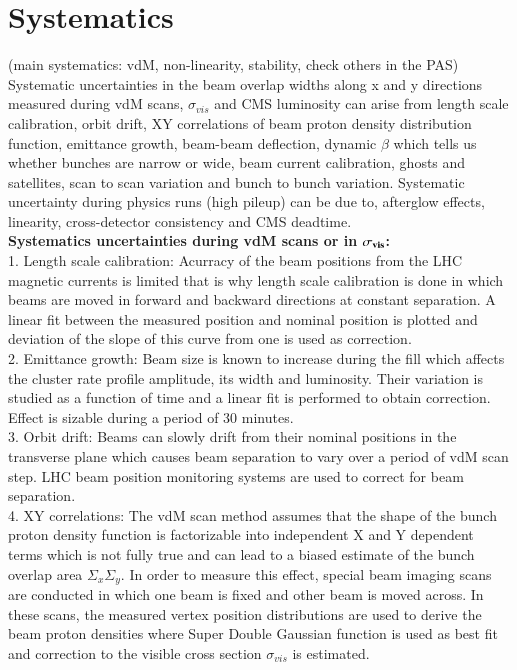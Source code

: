 \section{Systematics}
\label{sec:syst}
(main systematics: vdM, non-linearity, stability, check others in the PAS) \\

Systematic uncertainties in the beam overlap widths along x and y directions measured during vdM scans, $\sigma_{vis}$ and CMS luminosity can arise from length scale calibration, orbit drift, XY correlations of beam proton density distribution function, emittance growth, beam-beam deflection, dynamic $\beta$ which tells us whether bunches are narrow or wide, beam current calibration, ghosts and satellites, scan to scan variation and bunch to bunch variation. Systematic uncertainty during physics runs (high pileup) can be due to, afterglow effects, linearity, cross-detector consistency and CMS deadtime. \\

\textbf{Systematics uncertainties during vdM scans or in $\bf{\sigma_{vis}}$:} \\

1. Length scale calibration: Acurracy of the beam positions from the LHC magnetic currents is limited that is why length scale calibration is done in which beams are moved in forward and backward directions at constant separation. A linear fit between the measured position and nominal position is plotted and deviation of the slope of this curve from one is used as correction. \\

2. Emittance growth: Beam size is known to increase during the fill which affects the cluster rate profile amplitude, its width and luminosity. Their variation is studied as a function of time and a linear fit is performed to obtain correction. Effect is sizable during a period of 30 minutes. \\

3. Orbit drift: Beams can slowly drift from their nominal positions in the transverse plane which causes beam separation to vary over a period of vdM scan step. LHC beam position monitoring systems are used to correct for beam separation. \\

4. XY correlations: The vdM scan method assumes that the shape of the bunch proton density function is factorizable into independent X and Y dependent terms which is not fully true and can lead to a biased estimate of the bunch overlap area $\Sigma_x \Sigma_y$. In order to measure this effect, special beam imaging scans are conducted in which one beam is fixed and other beam is moved across. In these scans, the measured vertex position distributions are used to derive the beam proton densities where Super Double Gaussian function is used as best fit and correction to the visible cross section $\sigma_{vis}$ is estimated. \\

